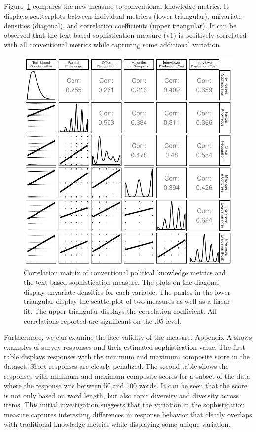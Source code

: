 \documentclass[12pt]{article}
\begin{document}
Figure~\ref{fig:corplot} compares the new measure to conventional knowledge metrics. It  displays scatterplots between individual metrices (lower triangular), univariate densities (diagonal), and correlation coefficients (upper triangular). It can be observed that the text-based sophistication measure (v1) is positively correlated with all conventional metrics while capturing some additional variation.

\begin{figure}[h]\centering
\includegraphics{../fig/corplot.pdf}
\caption{Correlation matrix of conventional political knowledge metrics and the text-based sophistication measure. The plots on the diagonal display unvariate densities for each variable. The panles in the lower triangular display the scatterplot of two measures as well as a linear fit. The upper triangular displays the correlation coefficient. All correlations reported are significant on the .05 level.}\label{fig:corplot}
\end{figure}

Furthermore, we can examine the face validity of the measure. Appendix A shows examples of survey responses and their estimated sophistication value. The first table displays responses with the minimum and maximum composite score in the dataset. Short responses are clearly penalized. The second table shows the responses with minimum and maximum composite scores for a subset of the data where the response was between 50 and 100 words. It can be seen that the score is not only based on word length, but also topic diversity and diversity across items. This initial investigation suggests that the variation in the sophistication measure captures interesting differences in response behavior that clearly overlaps with traditional knowledge metrics while displaying some unique variation.
\end{document}

